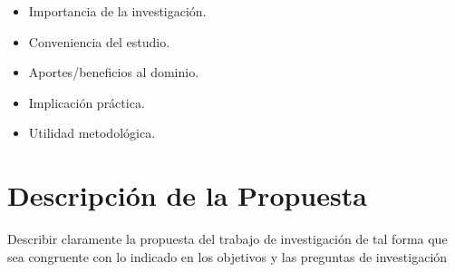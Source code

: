 \begin{itemize}
    \item Importancia de la investigación.
    \item Conveniencia del estudio.
    \item Aportes/beneficios al dominio.
    \item Implicación práctica.
    \item Utilidad metodológica.
\end{itemize}

\section{Descripción de la Propuesta}
Describir claramente la propuesta del trabajo de investigación de tal forma que sea congruente con lo indicado en los objetivos y las preguntas de investigación
